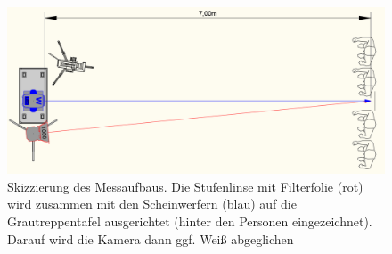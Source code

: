 \begin{figure}[H]     %
\centering
\includegraphics[width=1.0\textwidth]{bilder/aufbaumessung2} 
\caption {Skizzierung des Messaufbaus. Die Stufenlinse mit Filterfolie (rot) wird zusammen mit den Scheinwerfern (blau) auf die Grautreppentafel ausgerichtet (hinter den Personen eingezeichnet). Darauf wird die Kamera dann ggf. Weiß abgeglichen}\label{b_aufbaumessung2}
\end{figure}



